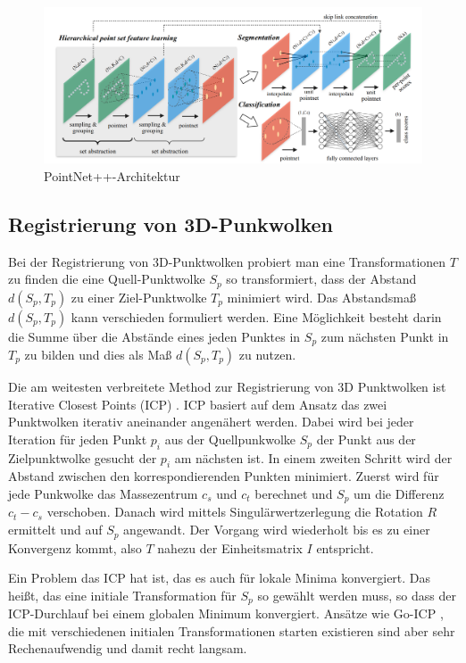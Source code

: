 \documentclass[12pt,titlepage, twoside]{article}
\begin{document}
\begin{figure}
    \centering
    \includegraphics[width=1.0\textwidth]{./Images/PointNetPPArchitektur.png}
    \caption{PointNet++-Architektur \cite{qi2017pointnet++}}
    \label{fig:point:net:pp:arch}
\end{figure}

\subsection{Registrierung von 3D-Punkwolken}
\label{sec:stand:registrierung}

Bei der Registrierung von 3D-Punktwolken probiert man eine Transformationen $T$ zu finden die eine Quell-Punktwolke $S_p$ so transformiert, dass der Abstand $d(S_p,T_p)$ zu einer Ziel-Punktwolke $T_p$ minimiert wird.
Das Abstandsmaß $d(S_p, T_p)$ kann verschieden formuliert werden. Eine Möglichkeit besteht darin die Summe über die Abstände eines jeden Punktes in $S_p$ 
zum nächsten Punkt in $T_p$ zu bilden und dies als Maß $d(S_p, T_p)$ zu nutzen.

Die am weitesten verbreitete Method zur Registrierung von 3D Punktwolken ist Iterative Closest Points (ICP) \cite{icp_org}. ICP basiert auf dem Ansatz das zwei Punktwolken iterativ aneinander angenähert werden.
Dabei wird bei jeder Iteration für jeden Punkt $p_i$ aus der Quellpunkwolke $S_p$ der Punkt aus der Zielpunktwolke gesucht der $p_i$ am nächsten ist. In einem zweiten Schritt wird der Abstand zwischen den korrespondierenden Punkten minimiert.
Zuerst wird für jede Punkwolke das Massezentrum $c_s$ und $c_t$ berechnet und $S_p$ um die Differenz $c_t - c_s$ verschoben. Danach wird mittels Singulärwertzerlegung die Rotation $R$ ermittelt und auf $S_p$ angewandt.
Der Vorgang wird wiederholt bis es zu einer Konvergenz kommt, also $T$ nahezu der Einheitsmatrix $I$ entspricht.

Ein Problem das ICP hat ist, das es auch für lokale Minima konvergiert. Das heißt, das eine initiale Transformation für $S_p$ so gewählt werden muss, so dass der ICP-Durchlauf bei einem globalen Minimum konvergiert.
Ansätze wie Go-ICP \cite{GoICP}, die mit verschiedenen initialen Transformationen starten existieren sind aber sehr Rechenaufwendig und damit recht langsam.
\end{document}
